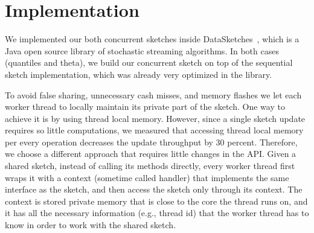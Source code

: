 \section{Implementation}
\label{sub:implementation}

We implemented our both concurrent sketches inside
DataSketches~\cite{}, which is a Java open source library
of stochastic streaming algorithms.
In both cases (quantiles and theta), we build our concurrent
sketch on top of the sequential sketch implementation, which was
already very optimized in the library.

To avoid false sharing, unnecessary cash misses, and memory
flashes we let each worker thread to locally maintain its private
part of the sketch.
One way to achieve it is by using thread local memory.
However, since a single sketch update requires so little
computations, we measured that accessing thread local memory per
every operation decreases the update throughput by 30 percent.
Therefore, we choose a different approach that requires little
changes in the API.
Given a shared sketch, instead of calling its methods
directly, every worker thread first wraps it with a context
(sometime called handler) that implements the same interface as
the sketch, and then access the sketch only through its context.
The context is stored private memory that is close to the core
the thread runs on, and it has all the necessary information
(e.g., thread id) that the worker thread has to know in order to 
work with the shared sketch.  




